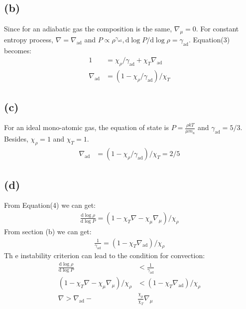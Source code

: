 \documentclass[a4paper,12pt]{article}
\renewcommand{\d}{\mathrm{d}}
\begin{document}
\subsection*{(b)}
Since for an adiabatic gas the composition is the same, $\nabla_\mu = 0$. 
For constant entropy process, $\nabla = \nabla_\text{ad}$ and $P\propto \rho^{\gamma_{\text{ad}}}, \d \log P/\d \log \rho = \gamma_\text{ad}$.
Equation(3) becomes:
\begin{align*}
    1 &= \chi_\rho / \gamma_\text{ad} + \chi_T \nabla_\text{ad} \\
    \nabla_\text{ad} &= (1-\chi_\rho / \gamma_\text{ad})/\chi_T
\end{align*}

\subsection*{(c)}
For an ideal mono-atomic gas, the equation of state is $P = \frac{\rho kT}{\mu m_u}$ and $\gamma_\text{ad} = 5/3$. Besides, 
$\chi_\rho = 1$ and $\chi_T = 1$.
\begin{align*}
    \nabla_\text{ad} &= (1-\chi_\rho / \gamma_\text{ad})/\chi_T = 2/5
\end{align*}

\subsection*{(d)}
From Equation(4) we can get:
\begin{align*}
    \frac{\d \log \rho}{\d \log P} = (1 - \chi_T \nabla - \chi_\mu \nabla_\mu)/\chi_\rho
\end{align*}
From section (b) we can get:
\begin{align*}
    \frac{1}{\gamma_\text{ad}} = (1 - \chi_T \nabla_\text{ad})/\chi_\rho
\end{align*}
Th e instability criterion can lead to the condition for convection:
\begin{align*}
    \frac{\d \log \rho}{\d \log P} &< \frac{1}{\gamma_\text{ad}} \\
    (1 - \chi_T \nabla - \chi_\mu \nabla_\mu)/\chi_\rho &< (1 - \chi_T \nabla_\text{ad})/\chi_\rho \\
    \nabla > \nabla_\text{ad} -& \frac{\chi_\mu}{\chi_T}\nabla_\mu
\end{align*}
\end{document}
